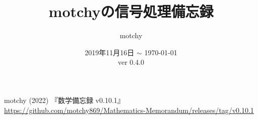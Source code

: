 \documentclass[dvipdfmx,uplatex,report]{jsbook} %
\theoremstyle{definition} %
\begin{document}
	\title{motchyの信号処理備忘録}
	\author{motchy}
	\date{ 2019年11月16日 $\sim$ \today \\ver 0.4.0}
	\maketitle
	{\scriptsize \tableofcontents}

	
	
	
	
	
	
	

	\begin{thebibliography}{9}
		motchy (2022) 『数学備忘録 v0.10.1』\url{https://github.com/motchy869/Mathematics-Memorandum/releases/tag/v0.10.1}
	\end{thebibliography}
\end{document}

